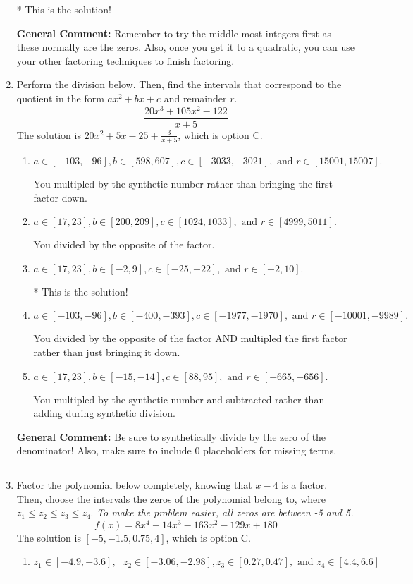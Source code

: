 \documentclass{extbook}[14pt]
\newcommand{\litem}[1]{\item #1

\rule{\textwidth}{0.4pt}}
\begin{document}
\begin{enumerate}
{\begin{enumerate}[label=\Alph*.]
* This is the solution!
\end{enumerate}

\textbf{General Comment:} Remember to try the middle-most integers first as these normally are the zeros. Also, once you get it to a quadratic, you can use your other factoring techniques to finish factoring.
}
\litem{
Perform the division below. Then, find the intervals that correspond to the quotient in the form $ax^2+bx+c$ and remainder $r$.
\[ \frac{20x^{3} +105 x^{2} -122}{x + 5} \]The solution is \( 20x^{2} +5 x -25 + \frac{3}{x + 5} \), which is option C.\begin{enumerate}[label=\Alph*.]
\item \( a \in [-103, -96], b \in [598, 607], c \in [-3033, -3021], \text{ and } r \in [15001, 15007]. \)

 You multipled by the synthetic number rather than bringing the first factor down.
\item \( a \in [17, 23], b \in [200, 209], c \in [1024, 1033], \text{ and } r \in [4999, 5011]. \)

 You divided by the opposite of the factor.
\item \( a \in [17, 23], b \in [-2, 9], c \in [-25, -22], \text{ and } r \in [-2, 10]. \)

* This is the solution!
\item \( a \in [-103, -96], b \in [-400, -393], c \in [-1977, -1970], \text{ and } r \in [-10001, -9989]. \)

 You divided by the opposite of the factor AND multipled the first factor rather than just bringing it down.
\item \( a \in [17, 23], b \in [-15, -14], c \in [88, 95], \text{ and } r \in [-665, -656]. \)

 You multipled by the synthetic number and subtracted rather than adding during synthetic division.
\end{enumerate}

\textbf{General Comment:} Be sure to synthetically divide by the zero of the denominator! Also, make sure to include 0 placeholders for missing terms.
}
\litem{
Factor the polynomial below completely, knowing that $x -4$ is a factor. Then, choose the intervals the zeros of the polynomial belong to, where $z_1 \leq z_2 \leq z_3 \leq z_4$. \textit{To make the problem easier, all zeros are between -5 and 5.}
\[ f(x) = 8x^{4} +14 x^{3} -163 x^{2} -129 x + 180 \]The solution is \( [-5, -1.5, 0.75, 4] \), which is option C.\begin{enumerate}[label=\Alph*.]
\item \( z_1 \in [-4.9, -3.6], \text{   }  z_2 \in [-3.06, -2.98], z_3 \in [0.27, 0.47], \text{   and   } z_4 \in [4.4, 6.6] \)


\end{enumerate}}
\end{enumerate}
\end{document}
